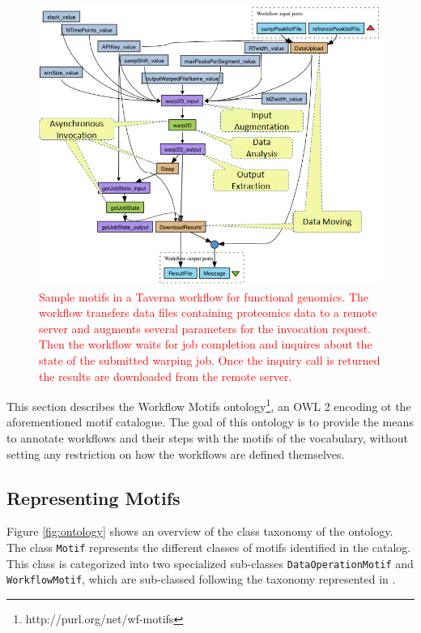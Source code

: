 \begin{figure}[ht!]
\centering
\includegraphics[scale=0.70]{Figures/taverna-wf-motifs.png}
\caption{\textcolor{red}{Sample motifs in a Taverna workflow for functional genomics. The workflow transfers data files containing proteomics data to a remote server and  augments several parameters for the invocation request. Then the workflow waits for job completion and inquires about the state of the submitted warping job. Once the inquiry call is returned the results are downloaded from the remote server.}}
\label{fig:tav_wf_motifs}
\end{figure}

This section describes the Workflow Motifs ontology\footnote{http://purl.org/net/wf-motifs}, an OWL 2 encoding ot the aforementioned motif catalogue. The goal of this ontology is to provide the means to annotate workflows and their steps with the motifs of the vocabulary, without setting any restriction on how the workflows are defined themselves.

\subsection{Representing Motifs}
Figure \ref{fig:ontology} shows an overview of the class taxonomy of the ontology. The class {\tt  Motif} represents the different classes of motifs identified in the catalog. This class is categorized into two specialized sub-classes {\tt  DataOperationMotif} and {\tt  WorkflowMotif}, which are sub-classed following the taxonomy represented in \cite{garijo_Alper_2012}.


